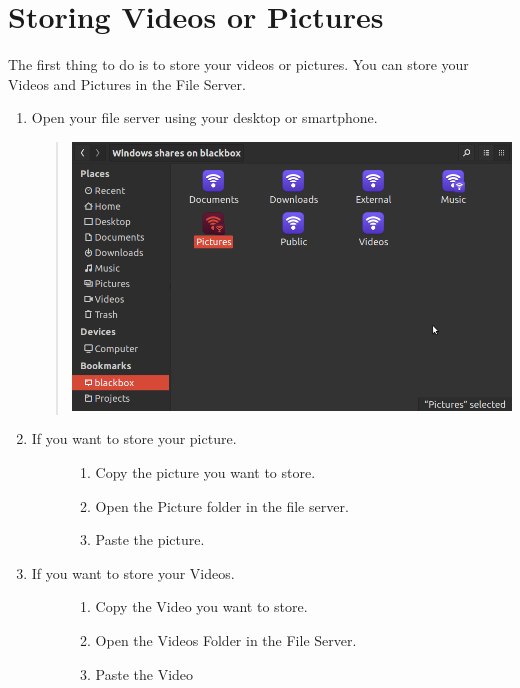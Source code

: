 \documentclass[letterpaper,10pt,english]{sphinxmanual}
\begin{document}
\section{Storing Videos or Pictures}
\label{video_and_pictures:storing-videos-or-pictures}\label{video_and_pictures:id1}
The first thing to do is to store your videos or pictures. You can store your Videos and Pictures in the File Server.
\begin{enumerate}
\item {} 
Open your file server using your desktop or smartphone.
\begin{quote}

\includegraphics{pictures.png}
\end{quote}

\item {} \begin{description}
\item[{If you want to store your picture.}] \leavevmode\begin{enumerate}
\item {} 
Copy the picture you want to store.

\item {} 
Open the Picture folder in the file server.

\item {} 
Paste the picture.

\end{enumerate}

\end{description}

\item {} \begin{description}
\item[{If you want to store your Videos.}] \leavevmode\begin{enumerate}
\item {} 
Copy the Video you want to store.

\item {} 
Open the Videos Folder in the File Server.

\item {} 
Paste the Video

\end{enumerate}

\end{description}

\end{enumerate}
\end{document}
